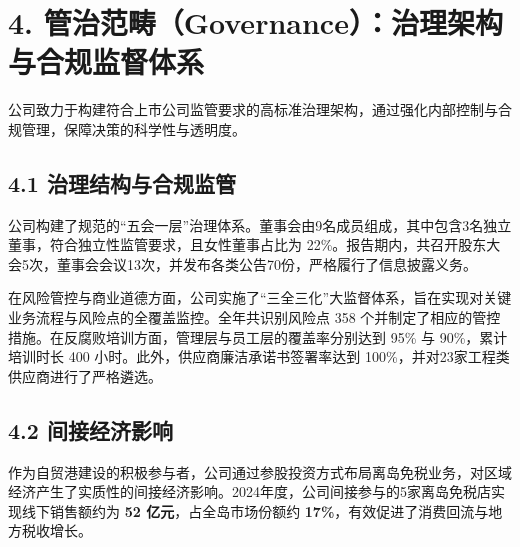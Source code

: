 \documentclass[a4paper,12pt]{article}
\begin{document}
\section{4. 管治范畴（Governance）：治理架构与合规监督体系}

公司致力于构建符合上市公司监管要求的高标准治理架构，通过强化内部控制与合规管理，保障决策的科学性与透明度。

\subsection{4.1 治理结构与合规监管}

公司构建了规范的“五会一层”治理体系。董事会由9名成员组成，其中包含3名独立董事，符合独立性监管要求，且女性董事占比为 22\%。报告期内，共召开股东大会5次，董事会会议13次，并发布各类公告70份，严格履行了信息披露义务。

在风险管控与商业道德方面，公司实施了“三全三化”大监督体系，旨在实现对关键业务流程与风险点的全覆盖监控。全年共识别风险点 358 个并制定了相应的管控措施。在反腐败培训方面，管理层与员工层的覆盖率分别达到 95\% 与 90\%，累计培训时长 400 小时。此外，供应商廉洁承诺书签署率达到 100\%，并对23家工程类供应商进行了严格遴选。

\subsection{4.2 间接经济影响}

作为自贸港建设的积极参与者，公司通过参股投资方式布局离岛免税业务，对区域经济产生了实质性的间接经济影响。2024年度，公司间接参与的5家离岛免税店实现线下销售额约为 \textbf{52 亿元}，占全岛市场份额约 \textbf{17\%}，有效促进了消费回流与地方税收增长。
\end{document}
